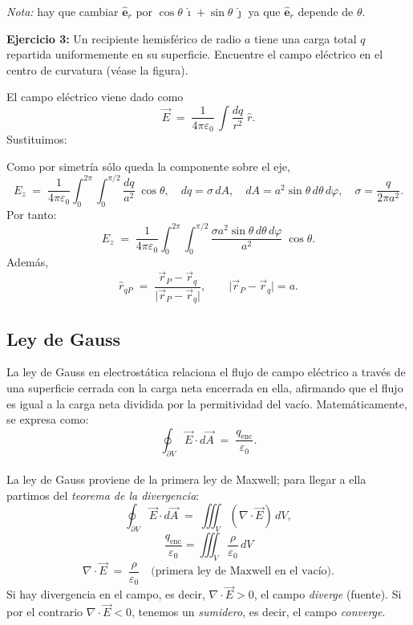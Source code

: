 \documentclass[a4paper,12pt]{article}
\begin{document}
\textit{Nota:} hay que cambiar \(\hat{\mathbf e}_r\) por \(\cos\theta\,\hat{\imath}+\sin\theta\,\hat{\jmath}\) ya que \(\hat{\mathbf e}_r\) depende de \(\theta\).

\bigskip
\noindent
\textbf{Ejercicio 3:}
Un recipiente hemisférico de radio \(a\) tiene una carga total \(q\) repartida uniformemente en su superficie.
Encuentre el campo eléctrico en el centro de curvatura (véase la figura).

\medskip
\noindent
El campo eléctrico viene dado como
\[
\vec E \;=\; \frac{1}{4\pi\varepsilon_0}\,\int \frac{dq}{r^{2}}\;\hat r .
\]
Sustituimos:

\medskip
\noindent
Como por simetría sólo queda la componente sobre el eje,
\[
E_z \;=\; \frac{1}{4\pi\varepsilon_0}
\int_{0}^{2\pi}\!\!\int_{0}^{\pi/2}
\frac{dq}{a^{2}}\;\cos\theta ,
\quad
dq=\sigma\,dA,\quad
dA=a^{2}\sin\theta\,d\theta\,d\varphi,
\quad
\sigma=\frac{q}{2\pi a^{2}} .
\]
Por tanto:
\[
E_z \;=\; \frac{1}{4\pi\varepsilon_0}
\int_{0}^{2\pi}\!\!\int_{0}^{\pi/2}
\frac{\sigma a^{2}\sin\theta\,d\theta\,d\varphi}{a^{2}}\;\cos\theta .
\]
Además,
\[
\hat r_{qP}\;=\;\frac{\vec r_{P}-\vec r_{q}}{\lvert \vec r_{P}-\vec r_{q}\rvert},
\qquad
\lvert \vec r_{P}-\vec r_{q}\rvert = a .
\]

\bigskip
\subsection{Ley de Gauss}
\noindent
La ley de Gauss en electrostática relaciona el flujo de campo eléctrico a través de una
superficie cerrada con la carga neta encerrada en ella, afirmando que el flujo es igual
a la carga neta dividida por la permitividad del vacío. Matemáticamente, se expresa como:
\[
\oint_{\partial V}\vec E\cdot d\vec A \;=\; \frac{q_{\text{enc}}}{\varepsilon_0}.
\]\\
La ley de Gauss proviene de la primera ley de Maxwell; para llegar a ella partimos del
\emph{teorema de la divergencia}:
\[
\oint_{\partial V}\vec E\cdot d\vec A
\;=\;
\iiint_{V} (\nabla\!\cdot\!\vec E)\,dV,
\]
\[
\frac{q_{\text{enc}}}{\varepsilon_0}
=
\iiint_{V} \frac{\rho}{\varepsilon_0}\,dV
\]
\[
\nabla\!\cdot\!\vec E \;=\; \frac{\rho}{\varepsilon_0}
\quad\text{(primera ley de Maxwell en el vacío).}
\]
Si hay divergencia en el campo, es decir, \(\nabla\!\cdot\!\vec E>0\), el campo \emph{diverge} (fuente).
Si por el contrario \(\nabla\!\cdot\!\vec E<0\), tenemos un \emph{sumidero}, es decir, el campo \emph{converge}.\\
\end{document}
